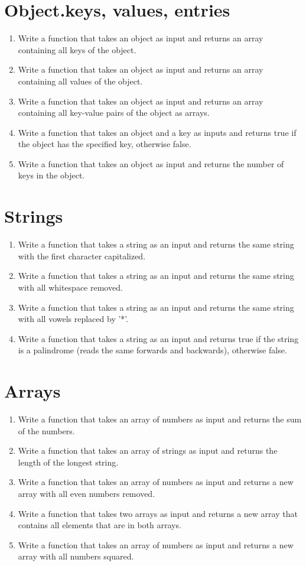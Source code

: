 \documentclass{article}
\begin{document}
\section{Object.keys, values, entries}
\begin{enumerate}
	\item Write a function that takes an object as input and returns an array containing all keys of the object.
	\item Write a function that takes an object as input and returns an array containing all values of the object.
	\item Write a function that takes an object as input and returns an array containing all key-value pairs of the object as arrays.
	\item Write a function that takes an object and a key as inputs and returns true if the object has the specified key, otherwise false.
	\item Write a function that takes an object as input and returns the number of keys in the object.
\end{enumerate}

\section{Strings}
\begin{enumerate}
	\item Write a function that takes a string as an input and returns the same string with the first character capitalized.

	\item Write a function that takes a string as an input and returns the same string with all whitespace removed.

	\item Write a function that takes a string as an input and returns the same string with all vowels replaced by '*'.

	\item Write a function that takes a string as an input and returns true if the string is a palindrome (reads the same forwards and backwards), otherwise false.
\end{enumerate}

\section{Arrays}
\begin{enumerate}
	\item Write a function that takes an array of numbers as input and returns the sum of the numbers.
	\item Write a function that takes an array of strings as input and returns the length of the longest string.
	\item Write a function that takes an array of numbers as input and returns a new array with all even numbers removed.
	\item Write a function that takes two arrays as input and returns a new array that contains all elements that are in both arrays.
	\item Write a function that takes an array of numbers as input and returns a new array with all numbers squared.
\end{enumerate}
\end{document}
